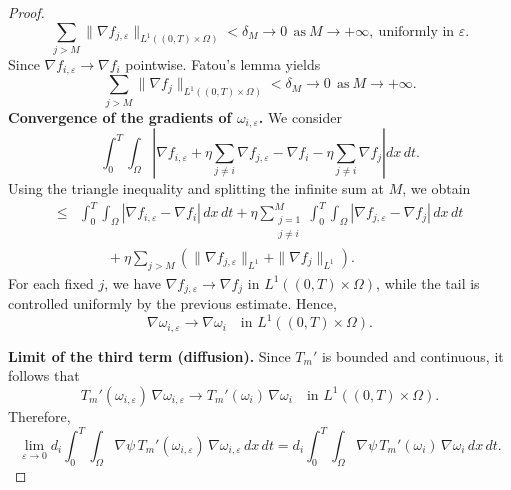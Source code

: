 \documentclass[10pt,a4paper]{amsart}
\begin{document}
\begin{proof}
		\[
		\sum_{j>M}
		\|\nabla f_{j,\varepsilon}\|_{L^1((0,T)\times\Omega)}
		<\delta_M \to 0 \ \ \text{as}\ M\to+\infty,
		\ \text{uniformly in } \varepsilon.
		\]
		Since $\nabla f_{i,\varepsilon}\to \nabla f_{i}$ pointwise. Fatou's lemma yields
		\[
		\sum_{j>M}
		\|\nabla f_{j}\|_{L^1((0,T)\times\Omega)}
		<\delta_M \to 0 \ \ \text{as}\ M\to+\infty.
		\]
		\medskip
		\noindent\textbf{Convergence of the gradients of $\omega_{i,\varepsilon}$.}
		We consider
		\[
		\int_{0}^{T}\!\!\int_{\Omega}
		\left|
		\nabla f_{i,\varepsilon}
		+ \eta \sum_{j\ne i} \nabla f_{j,\varepsilon}
		-
		\nabla f_i
		-
		\eta \sum_{j\ne i} \nabla f_j
		\right| dx\,dt .
		\]
		Using the triangle inequality and splitting the infinite sum at $M$, we obtain
		\begin{align*}
			\le{}&
			\int_{0}^{T}\!\!\int_{\Omega}
			|\nabla f_{i,\varepsilon}-\nabla f_i|\,dx\,dt
			+
			\eta \sum_{\substack{j=1\\ j\ne i}}^{M}
			\int_{0}^{T}\!\!\int_{\Omega}
			|\nabla f_{j,\varepsilon}-\nabla f_j|\,dx\,dt
			\\
			&\qquad
			+
			\eta \sum_{j>M}
			\left(
			\|\nabla f_{j,\varepsilon}\|_{L^1}
			+
			\|\nabla f_j\|_{L^1}
			\right).
		\end{align*}
		For each fixed $j$, we have $\nabla f_{j,\varepsilon}\to\nabla f_j$ in
		$L^1((0,T)\times\Omega)$, while the tail is controlled uniformly by the
		previous estimate. Hence,
		\[
		\nabla\omega_{i,\varepsilon}
		\longrightarrow
		\nabla\omega_i
		\quad \text{in } L^1((0,T)\times\Omega).
		\]
		
		\medskip
		\noindent\textbf{Limit of the third term (diffusion).}
		Since $T_m'$ is bounded and continuous, it follows that
		\[
		T_m'(\omega_{i,\varepsilon})\,\nabla\omega_{i,\varepsilon}
		\longrightarrow
		T_m'(\omega_i)\,\nabla\omega_i
		\quad \text{in } L^1((0,T)\times\Omega).
		\]
		Therefore,
		\[
		\lim_{\varepsilon\to0}
		d_i \int_{0}^{T}\!\!\int_{\Omega}
		\nabla\psi\,
		T_m'(\omega_{i,\varepsilon})\,
		\nabla\omega_{i,\varepsilon}\,dx\,dt
		=
		d_i \int_{0}^{T}\!\!\int_{\Omega}
		\nabla\psi\,
		T_m'(\omega_i)\,
		\nabla\omega_i\,dx\,dt .
		\]
		

\end{proof}
\end{document}
